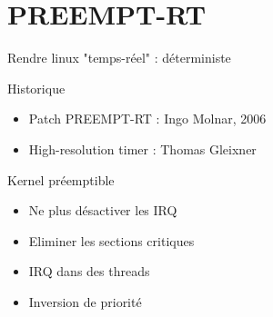 \section{PREEMPT-RT}
\begin{frame}
Rendre linux "temps-réel" : déterministe
\begin{block}{Historique}
\begin{itemize}
	\item Patch PREEMPT-RT : Ingo Molnar, 2006
	\item High-resolution timer : Thomas Gleixner
\end{itemize}
\end{block}
\begin{block}{Kernel préemptible}
\begin{itemize}
	\item Ne plus désactiver les IRQ
	\item Eliminer les sections critiques %
	\item IRQ dans des threads
	\item Inversion de priorité
\end{itemize}
\end{block}

\end{frame}

